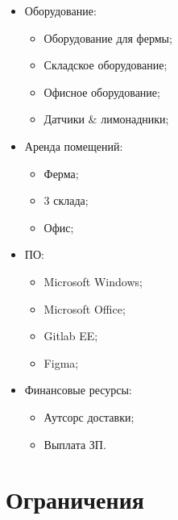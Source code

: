 \documentclass[a4paper,8pt]{article}
\begin{document}
    \begin{itemize}
        \item Оборудование:
            \begin{itemize}
                \item Оборудование для фермы;
                \item Складское оборудование;
                \item Офисное оборудование;
                \item Датчики \& лимонадники;
            \end{itemize}

        \item Аренда помещений:
            \begin{itemize}
                \item Ферма;
                \item 3 склада;
                \item Офис;
            \end{itemize}

        \item ПО:
            \begin{itemize}
                \item Microsoft Windows;
                \item Microsoft Office;
                \item Gitlab EE;
                \item Figma;
            \end{itemize}

        \item Финансовые ресурсы:
            \begin{itemize}
                \item Аутсорс доставки;
                \item Выплата ЗП.
            \end{itemize}

    \end{itemize}


\section*{Ограничения}
\end{document}
